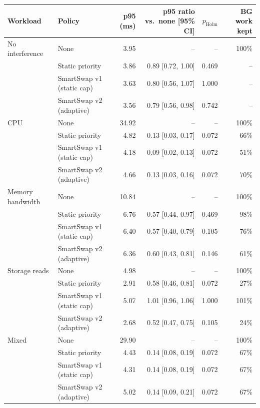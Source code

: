 \begin{tabular}{llrrrr}
\toprule
Workload & Policy & p95 (ms) & p95 ratio vs.\ none [95\% CI] & $p_{\mathrm{Holm}}$ & BG work kept \\
\midrule
No interference & None & 3.95 & -- & -- & 100\% \\
 & Static priority & 3.86 & 0.89 [0.72, 1.00] & 0.469 & -- \\
 & SmartSwap v1 (static cap) & 3.63 & 0.80 [0.56, 1.07] & 1.000 & -- \\
 & SmartSwap v2 (adaptive) & 3.56 & 0.79 [0.56, 0.98] & 0.742 & -- \\
\midrule
CPU & None & 34.92 & -- & -- & 100\% \\
 & Static priority & 4.82 & 0.13 [0.03, 0.17] & 0.072 & 66\% \\
 & SmartSwap v1 (static cap) & 4.18 & 0.09 [0.02, 0.13] & 0.072 & 51\% \\
 & SmartSwap v2 (adaptive) & 4.66 & 0.13 [0.03, 0.16] & 0.072 & 70\% \\
\midrule
Memory bandwidth & None & 10.84 & -- & -- & 100\% \\
 & Static priority & 6.76 & 0.57 [0.44, 0.97] & 0.469 & 98\% \\
 & SmartSwap v1 (static cap) & 6.40 & 0.57 [0.40, 0.79] & 0.105 & 76\% \\
 & SmartSwap v2 (adaptive) & 6.36 & 0.60 [0.43, 0.81] & 0.146 & 61\% \\
\midrule
Storage reads & None & 4.98 & -- & -- & 100\% \\
 & Static priority & 2.91 & 0.58 [0.46, 0.81] & 0.072 & 27\% \\
 & SmartSwap v1 (static cap) & 5.07 & 1.01 [0.96, 1.06] & 1.000 & 101\% \\
 & SmartSwap v2 (adaptive) & 2.68 & 0.52 [0.47, 0.75] & 0.105 & 24\% \\
\midrule
Mixed & None & 29.90 & -- & -- & 100\% \\
 & Static priority & 4.43 & 0.14 [0.08, 0.19] & 0.072 & 67\% \\
 & SmartSwap v1 (static cap) & 4.31 & 0.14 [0.08, 0.19] & 0.072 & 67\% \\
 & SmartSwap v2 (adaptive) & 5.02 & 0.14 [0.09, 0.21] & 0.072 & 67\% \\
\bottomrule
\end{tabular}